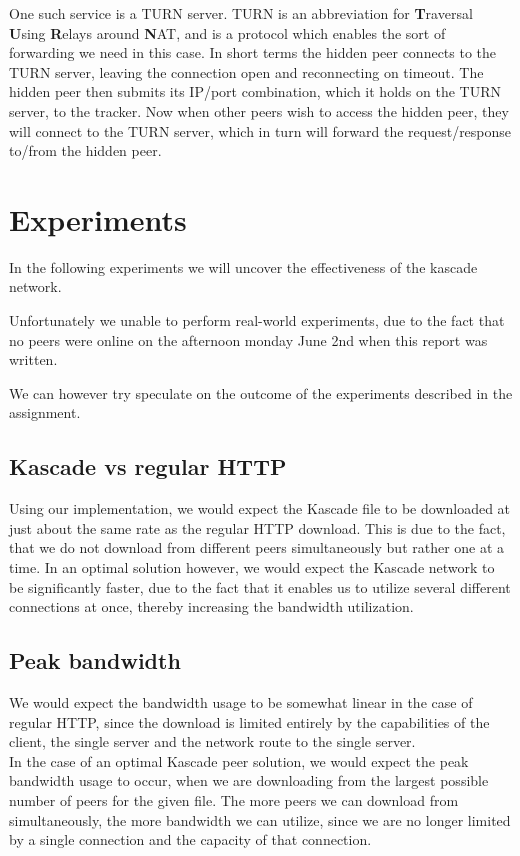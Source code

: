 \documentclass{acm_proc_article-sp}
\begin{document}
One such service is a TURN server. TURN is an abbreviation for \textbf{T}raversal \textbf{U}sing \textbf{R}elays around \textbf{N}AT, and is a protocol which enables the sort of forwarding we need in this case.
In short terms the hidden peer connects to the TURN server, leaving the connection open and reconnecting on timeout. The hidden peer then submits its IP/port combination, which it holds on the TURN server, to the tracker.
Now when other peers wish to access the hidden peer, they will connect to the TURN server, which in turn will forward the request/response to/from the hidden peer.

\section{Experiments}
In the following experiments we will uncover the effectiveness of the kascade network.

Unfortunately we unable to perform real-world experiments, due to the fact that no peers were online on the afternoon monday June 2nd when this report was written.

We can however try speculate on the outcome of the experiments described in the assignment.

\subsection{Kascade vs regular HTTP}
Using our implementation, we would expect the Kascade file to be downloaded at just about the same rate as the regular HTTP download. This is due to the fact, that we do not download from different peers simultaneously but rather one at a time. In an optimal solution however, we would expect the Kascade network to be significantly faster, due to the fact that it enables us to utilize several different connections at once, thereby increasing the bandwidth utilization. 

\subsection{Peak bandwidth}
We would expect the bandwidth usage to be somewhat linear in the case of regular HTTP, since the download is limited entirely by the capabilities of the client, the single server and the network route to the single server.\\
In the case of an optimal Kascade peer solution, we would expect the peak bandwidth usage to occur, when we are downloading from the largest possible number of peers for the given file. The more peers we can download from simultaneously, the more bandwidth we can utilize, since we are no longer limited by a single connection and the capacity of that connection.
\end{document}
